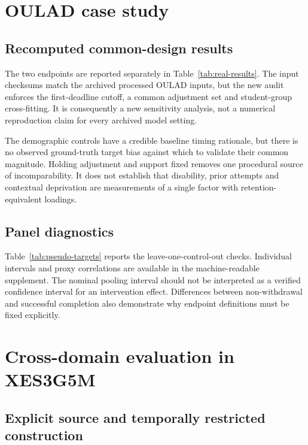 \section{OULAD case study}

\subsection{Recomputed common-design results}

The two endpoints are reported separately in Table~\ref{tab:real-results}. The input checksums match the archived processed OULAD inputs, but the new audit enforces the first-deadline cutoff, a common adjustment set and student-group cross-fitting. It is consequently a new sensitivity analysis, not a numerical reproduction claim for every archived model setting.



The demographic controls have a credible baseline timing rationale, but there is no observed ground-truth target bias against which to validate their common magnitude. Holding adjustment and support fixed removes one procedural source of incomparability. It does not establish that disability, prior attempts and contextual deprivation are measurements of a single factor with retention-equivalent loadings.

\subsection{Panel diagnostics}

Table~\ref{tab:pseudo-targets} reports the leave-one-control-out checks. Individual intervals and proxy correlations are available in the machine-readable supplement. The nominal pooling interval should not be interpreted as a verified confidence interval for an intervention effect. Differences between non-withdrawal and successful completion also demonstrate why endpoint definitions must be fixed explicitly.



\section{Cross-domain evaluation in XES3G5M}

\subsection{Explicit source and temporally restricted construction}

